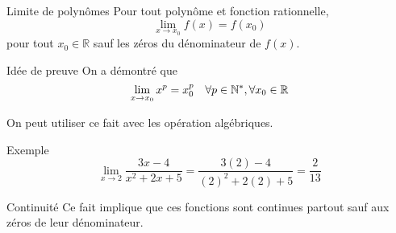 \documentclass[a4paper]{article}
\begin{document}
\begin{parag}{Limite de polynômes}
        Pour tout polynôme et fonction rationnelle,
        \[\lim_{x \to x_0} f\left(x\right) = f\left(x_0\right) \]
        pour tout $x_0 \in \mathbb{R}$ sauf les zéros du dénominateur de $f\left(x\right)$.

    \begin{subparag}{Idée de preuve}
            On a démontré que
            \[\lim_{x \to x_0} x^{p} = x_0^p \quad \forall p \in \mathbb{N}^*, \forall x_0 \in \mathbb{R}\]

            On peut utiliser ce fait avec les opération algébriques.
    \end{subparag}

    \begin{subparag}{Exemple}
            \[\lim_{x \to 2} \frac{3x - 4}{x^2 + 2x + 5} = \frac{3\left(2\right) - 4}{\left(2\right)^2 + 2\left(2\right) + 5} = \frac{2}{13}\]
    \end{subparag}

    \begin{subparag}{Continuité}
            Ce fait implique que ces fonctions sont continues partout sauf aux zéros de leur dénominateur.
    \end{subparag}
\end{parag}
\end{document}
